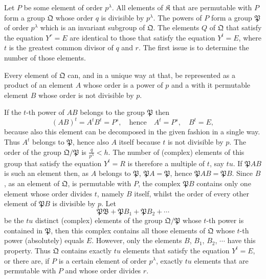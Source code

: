 \documentclass[a5paper,12pt]{article}
\let\fr\mathfrak
\newcommand{\CB}{\fr{B}}
\newcommand{\CK}{\fr{K}}
\newcommand{\CP}{\fr{P}}
\newcommand{\CQ}{\fr{Q}}
\newcommand{\?}{{\color{blue}${}^{(?)}$}}
\begin{document}

Let $P$ be some element of order $p^\lambda$.
%
%
All elements of $\CK$ that are permutable with $P$
form a group $\CQ$
whose order $q$ is divisible by $p^\lambda$.
%
%
The powers of $P$
form a group $\CP$ of order $p^\lambda$
which is an invariant subgroup of $\CQ$.
%
%
The elements $Q$ of $\CQ$
that satisfy the equation $Y^r = E$
are identical
to those
that satisfy the equation $Y^t = E$,
where $t$
is
the greatest common divisor of $q$ and $r$.
%
%
The first issue
is to determine
the number of those elements.


Every element of $\CQ$ can,
and in a unique way at that,
be represented
as a product
of an element $A$
whose order is a power of $p$
and
a with it permutable element $B$
whose order is not divisible by $p$.


If the $t$-th power of $A B$
belongs to the group $\CP$
then
\[
	(A B)^t = A^t B^t = P^s,
	\quad
	\text{hence}
	\quad
	A^t = P^s,
	\quad
	B^t = E,
\]
because also this element
can be decomposed in the given fashion
in a single way.
%
%
Thus
$A^t$ belongs to $\CP$,
hence also $A$ itself
because $t$ is not divisible by $p$.
%
%
The order of the group $\CQ / \CP$
is
$\frac{q}{p^\lambda} < h$.
%
%
The number of (complex) elements
of this group
that satisfy the equation $Y^t = R$
is therefore
a multiple of $t$,
say $t u$.
%
%
If $\CP A B$ is such an element
then,
as $A$ belongs to $\CP$,
$\CP A = \CP$,
hence $\CP A B = \CP B$.
%
%
Since $B$,
as an element of $\CQ$,
is permutable with $P$,
the complex $\CP B$
contains only one element
whose order divides $t$,
namely $B$ itself,
whilst
the order of every other element of $\CP B$
is divisible by $p$.
%
%
Let
\[
	\CP \CB + \CP B_1 + \CP B_2 + \cdots
\]
be the $t u$ distinct (complex) elements
of the group $\CQ / \CP$
whose
$t$-th power is contained in $\CP$,
then
this complex contains all those elements of $\CQ$
whose $t$-th power
(absolutely)
equals $E$.
%
%
However,
only the elements $B$, $B_1$, $B_2$, $\cdots$
have this property.
%
%
Thus $\CQ$ contains
exactly $t u$ elements
that satisfy the equation $Y^t = E$,
or
there are,
if $P$ is a certain element of order $p^\lambda$,
exactly $t u$ elements
that are permutable with $P$
and
whose order divides $r$.

\end{document}
